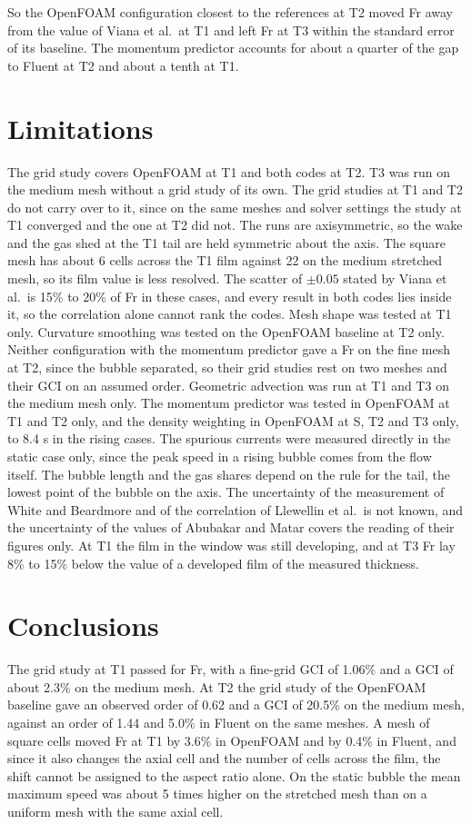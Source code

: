 \documentclass[11pt,a4paper]{article}
\begin{document}
So the OpenFOAM configuration closest to the references at T2 moved Fr away from the value of Viana et al.\ at T1 and left Fr at T3 within the standard error of its baseline. The momentum predictor accounts for about a quarter of the gap to Fluent at T2 and about a tenth at T1.

\section{Limitations}

The grid study covers OpenFOAM at T1 and both codes at T2. T3 was run on the medium mesh without a grid study of its own. The grid studies at T1 and T2 do not carry over to it, since on the same meshes and solver settings the study at T1 converged and the one at T2 did not. The runs are axisymmetric, so the wake and the gas shed at the T1 tail are held symmetric about the axis. The square mesh has about 6 cells across the T1 film against 22 on the medium stretched mesh, so its film value is less resolved. The scatter of $\pm0.05$ stated by Viana et al.\ is 15\% to 20\% of Fr in these cases, and every result in both codes lies inside it, so the correlation alone cannot rank the codes. Mesh shape was tested at T1 only. Curvature smoothing was tested on the OpenFOAM baseline at T2 only. Neither configuration with the momentum predictor gave a Fr on the fine mesh at T2, since the bubble separated, so their grid studies rest on two meshes and their GCI on an assumed order. Geometric advection was run at T1 and T3 on the medium mesh only. The momentum predictor was tested in OpenFOAM at T1 and T2 only, and the density weighting in OpenFOAM at S, T2 and T3 only, to 8.4 s in the rising cases. The spurious currents were measured directly in the static case only, since the peak speed in a rising bubble comes from the flow itself. The bubble length and the gas shares depend on the rule for the tail, the lowest point of the bubble on the axis. The uncertainty of the measurement of White and Beardmore and of the correlation of Llewellin et al.\ is not known, and the uncertainty of the values of Abubakar and Matar covers the reading of their figures only. At T1 the film in the window was still developing, and at T3 Fr lay 8\% to 15\% below the value of a developed film of the measured thickness.
\section{Conclusions}

The grid study at T1 passed for Fr, with a fine-grid GCI of 1.06\% and a GCI of about 2.3\% on the medium mesh. At T2 the grid study of the OpenFOAM baseline gave an observed order of 0.62 and a GCI of 20.5\% on the medium mesh, against an order of 1.44 and 5.0\% in Fluent on the same meshes. A mesh of square cells moved Fr at T1 by 3.6\% in OpenFOAM and by 0.4\% in Fluent, and since it also changes the axial cell and the number of cells across the film, the shift cannot be assigned to the aspect ratio alone. On the static bubble the mean maximum speed was about 5 times higher on the stretched mesh than on a uniform mesh with the same axial cell.
\end{document}
